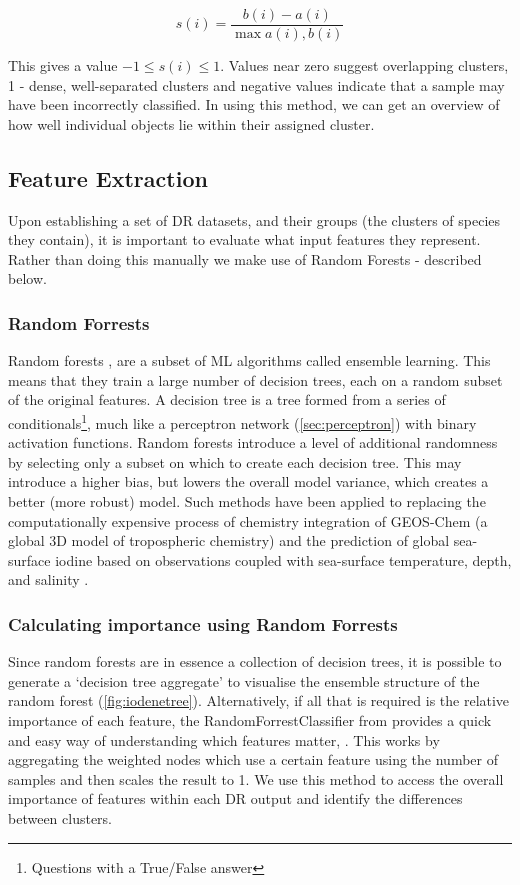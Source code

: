 \begin{equation}
s(i) = \frac{b(i)-a(i)}{\max{ a(i), b(i)}}
\end{equation}

This gives a value $-1 \le s(i) \le 1$. Values near zero suggest overlapping clusters, 1 - dense, well-separated clusters and negative values indicate that a sample may have been incorrectly classified. In using this method, we can get an overview of how well individual objects lie within their assigned cluster.




\subsection{Feature Extraction}\label{sec:drfeature}
Upon establishing a set of DR datasets, and their groups (the clusters of species they contain), it is important to evaluate what input features they represent. Rather than doing this manually we make use of Random Forests - described below.

\subsubsection{Random Forrests}
Random forests \citep{rfrr}, are a subset of ML algorithms called ensemble learning. This means that they train a large number of decision trees, each on a random subset of the original features. A decision tree is a tree formed from a series of conditionals\footnote{Questions with a True/False answer}, much like a perceptron network (\autoref{sec:perceptron}) with binary activation functions. Random forests introduce a level of additional randomness by selecting only a subset on which to create each decision tree. This may introduce a higher bias, but lowers the overall model variance, which creates a better (more robust) model. Such methods have been applied to replacing the computationally expensive process of chemistry integration of GEOS-Chem (a global 3D model of tropospheric chemistry) \citep{geosrf} and the prediction of global sea-surface iodine based on observations coupled with sea-surface temperature, depth, and salinity \citep{iodene}.

\subsubsection{Calculating importance using Random Forrests}
Since random forests are in essence a collection of decision trees, it is possible to generate a `decision tree aggregate' to visualise the ensemble structure of the random forest \citep{forrester} (\autoref{fig:iodenetree}). Alternatively, if all that is required is the relative importance of each feature, the RandomForrestClassifier from \cite{sklearn} provides a quick and easy way of understanding which features matter, 
\citep{handsonml}. This works by aggregating the weighted nodes which use a certain feature using the number of samples and then scales the result to 1. We use this method to access the overall importance of features within each DR output and identify the differences between clusters.


